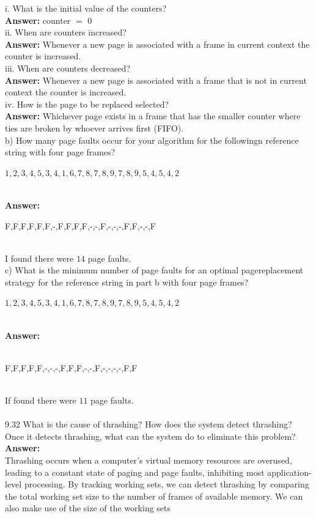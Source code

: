 \documentclass[12pt]{article}
\begin{document}
i. What is the initial value of the counters?\\
\textbf{Answer: } counter $=$ $0$
\\
ii. When are counters increased?\\
\textbf{Answer: }Whenever a new page is associated with a frame in current 
context the counter is increased.
\\
iii. When are counters decreased?\\
\textbf{Answer: }Whenever a new page is associated with a frame that is not 
in current context the counter is increased.
\\
iv. How is the page to be replaced selected?\\
\textbf{Answer: } Whichever page exists in a frame that has the smaller 
counter where ties are broken by whoever arrives first (FIFO).
\\
b) How many page faults occur for your algorithm for the followingn
reference string with four page frames?\\
\centerline{$1, 2, 3, 4, 5, 3, 4, 1, 6, 7, 8, 7, 8, 9, 7, 8, 9, 5, 4, 5, 4, 2$}\\
\textbf{Answer: }\\
\centerline{F,F,F,F,F,F,-,F,F,F,F,-,-,F,-,-,-,F,F,-,-,F}\\
I found there were $14$ page faults.
\\
c) What is the minimum number of page faults for an optimal pagereplacement
strategy for the reference string in part b with four
page frames?\\
\centerline{$1, 2, 3, 4, 5, 3, 4, 1, 6, 7, 8, 7, 8, 9, 7, 8, 9, 5, 4, 5, 4, 2$}\\
\textbf{Answer: }\\\\
\centerline{F,F,F,F,F,-,-,-,F,F,F,-,-,F,-,-,-,-,F,F}\\
If found there were $11$ page faults.
\\\\
9.32 What is the cause of thrashing? How does the system detect thrashing?
Once it detects thrashing, what can the system do to eliminate this
problem?\\
\textbf{Answer: }\\
Thrashing occurs when a computer's virtual memory resources are overused, 
leading to a constant state of paging and page faults, inhibiting most 
application-level processing. By tracking working sets, we can detect 
thrashing by comparing the total working set size to the number of frames 
of available memory. We can also make use of the size of the working sets 
\end{document}
